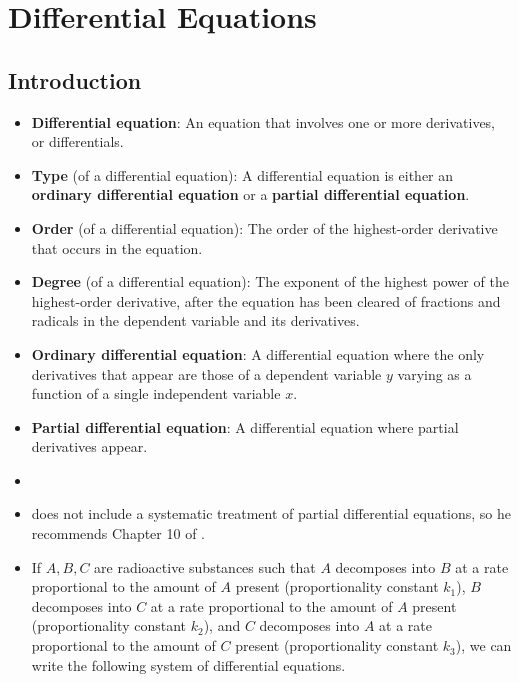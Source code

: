 \documentclass[../main.tex]{subfiles}
\begin{document}
\chapter{Differential Equations}\label{cht:20}
\section{Introduction}
\begin{itemize}
    \item {}\textbf{Differential equation}: An equation that involves one or more derivatives, or differentials.
    \item \textbf{Type} (of a differential equation): A differential equation is either an \textbf{ordinary differential equation} or a \textbf{partial differential equation}.
    \item \textbf{Order} (of a differential equation): The order of the highest-order derivative that occurs in the equation.
    \item \textbf{Degree} (of a differential equation): The exponent of the highest power of the highest-order derivative, after the equation has been cleared of fractions and radicals in the dependent variable and its derivatives.
    \item \textbf{Ordinary differential equation}: A differential equation where the only derivatives that appear are those of a dependent variable $y$ varying as a function of a single independent variable $x$.
    \item \textbf{Partial differential equation}: A differential equation where partial derivatives appear.
    \item {}
    \item \textcite{bib:Thomas} does not include a systematic treatment of partial differential equations, so he recommends Chapter 10 of \textcite{bib:Kaplan}.
    \item If $A,B,C$ are radioactive substances such that $A$ decomposes into $B$ at a rate proportional to the amount of $A$ present (proportionality constant $k_1$), $B$ decomposes into $C$ at a rate proportional to the amount of $A$ present (proportionality constant $k_2$), and $C$ decomposes into $A$ at a rate proportional to the amount of $C$ present (proportionality constant $k_3$), we can write the following system of differential equations.

\end{itemize}
\end{document}
